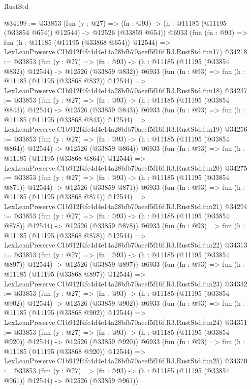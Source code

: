 \begin{lexlean}{RustStd}
\begin{coremodule}
@34199 := @33853
    (fun (y : @27) =>
    (fn : @93) -> (h : @11185 (@11195 (@33854 @654)) @12544) -> @12526 (@33859 @654))
    @6933
    (fun (fn : @93) =>
    fun (h : @11185 (@11195 (@33868 @654)) @12544) =>
    LexLeanPreserve.C1b912f4fc4d4e14a28bfb70aeef5f16f.R3.RustStd.fun17)
@34218 := @33853
    (fun (y : @27) =>
    (fn : @93) -> (h : @11185 (@11195 (@33854 @832)) @12544) -> @12526 (@33859 @832))
    @6933
    (fun (fn : @93) =>
    fun (h : @11185 (@11195 (@33868 @832)) @12544) =>
    LexLeanPreserve.C1b912f4fc4d4e14a28bfb70aeef5f16f.R3.RustStd.fun18)
@34237 := @33853
    (fun (y : @27) =>
    (fn : @93) -> (h : @11185 (@11195 (@33854 @843)) @12544) -> @12526 (@33859 @843))
    @6933
    (fun (fn : @93) =>
    fun (h : @11185 (@11195 (@33868 @843)) @12544) =>
    LexLeanPreserve.C1b912f4fc4d4e14a28bfb70aeef5f16f.R3.RustStd.fun19)
@34256 := @33853
    (fun (y : @27) =>
    (fn : @93) -> (h : @11185 (@11195 (@33854 @864)) @12544) -> @12526 (@33859 @864))
    @6933
    (fun (fn : @93) =>
    fun (h : @11185 (@11195 (@33868 @864)) @12544) =>
    LexLeanPreserve.C1b912f4fc4d4e14a28bfb70aeef5f16f.R3.RustStd.fun20)
@34275 := @33853
    (fun (y : @27) =>
    (fn : @93) -> (h : @11185 (@11195 (@33854 @871)) @12544) -> @12526 (@33859 @871))
    @6933
    (fun (fn : @93) =>
    fun (h : @11185 (@11195 (@33868 @871)) @12544) =>
    LexLeanPreserve.C1b912f4fc4d4e14a28bfb70aeef5f16f.R3.RustStd.fun21)
@34294 := @33853
    (fun (y : @27) =>
    (fn : @93) -> (h : @11185 (@11195 (@33854 @878)) @12544) -> @12526 (@33859 @878))
    @6933
    (fun (fn : @93) =>
    fun (h : @11185 (@11195 (@33868 @878)) @12544) =>
    LexLeanPreserve.C1b912f4fc4d4e14a28bfb70aeef5f16f.R3.RustStd.fun22)
@34313 := @33853
    (fun (y : @27) =>
    (fn : @93) -> (h : @11185 (@11195 (@33854 @897)) @12544) -> @12526 (@33859 @897))
    @6933
    (fun (fn : @93) =>
    fun (h : @11185 (@11195 (@33868 @897)) @12544) =>
    LexLeanPreserve.C1b912f4fc4d4e14a28bfb70aeef5f16f.R3.RustStd.fun23)
@34332 := @33853
    (fun (y : @27) =>
    (fn : @93) -> (h : @11185 (@11195 (@33854 @902)) @12544) -> @12526 (@33859 @902))
    @6933
    (fun (fn : @93) =>
    fun (h : @11185 (@11195 (@33868 @902)) @12544) =>
    LexLeanPreserve.C1b912f4fc4d4e14a28bfb70aeef5f16f.R3.RustStd.fun24)
@34351 := @33853
    (fun (y : @27) =>
    (fn : @93) -> (h : @11185 (@11195 (@33854 @920)) @12544) -> @12526 (@33859 @920))
    @6933
    (fun (fn : @93) =>
    fun (h : @11185 (@11195 (@33868 @920)) @12544) =>
    LexLeanPreserve.C1b912f4fc4d4e14a28bfb70aeef5f16f.R3.RustStd.fun25)
@34370 := @33853
    (fun (y : @27) =>
    (fn : @93) -> (h : @11185 (@11195 (@33854 @961)) @12544) -> @12526 (@33859 @961))

\end{coremodule}
\end{lexlean}
